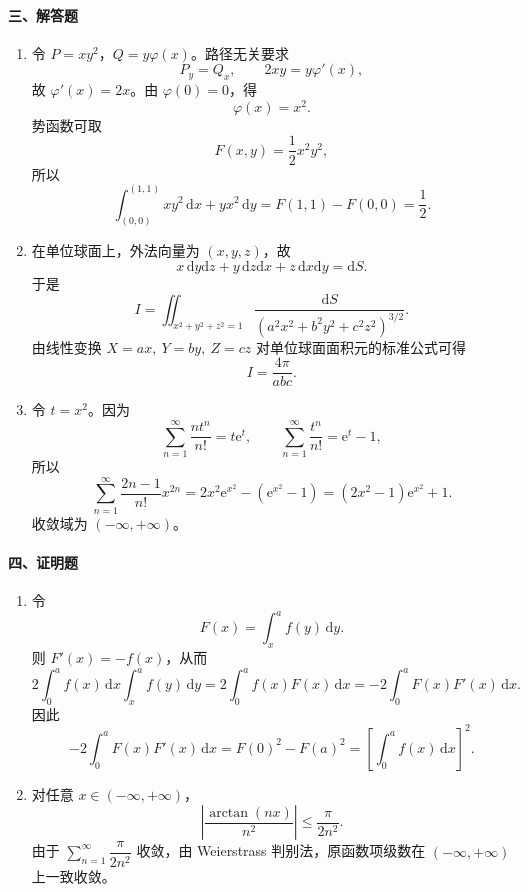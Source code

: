 \paragraph*{三、解答题}
\begin{enumerate}
  \item 令 \(P=xy^2\)，\(Q=y\varphi(x)\)。路径无关要求
  \[
    P_y=Q_x,\qquad 2xy=y\varphi'(x),
  \]
  故 \(\varphi'(x)=2x\)。由 \(\varphi(0)=0\)，得
  \[
    \varphi(x)=x^2.
  \]
  势函数可取
  \[
    F(x,y)=\frac12x^2y^2,
  \]
  所以
  \[
    \int_{(0,0)}^{(1,1)}xy^2\,\mathrm{d}x+yx^2\,\mathrm{d}y
    =F(1,1)-F(0,0)=\frac12.
  \]

  \item 在单位球面上，外法向量为 \((x,y,z)\)，故
  \[
    x\,\mathrm{d}y\mathrm{d}z+y\,\mathrm{d}z\mathrm{d}x+z\,\mathrm{d}x\mathrm{d}y=\mathrm{d}S.
  \]
  于是
  \[
    I=\iint_{x^2+y^2+z^2=1}
    \frac{\mathrm{d}S}{(a^2x^2+b^2y^2+c^2z^2)^{3/2}}.
  \]
  由线性变换 \(X=ax,\ Y=by,\ Z=cz\) 对单位球面面积元的标准公式可得
  \[
    I=\frac{4\pi}{abc}.
  \]

  \item 令 \(t=x^2\)。因为
  \[
    \sum_{n=1}^{\infty}\frac{nt^n}{n!}=t\mathrm{e}^t,\qquad
    \sum_{n=1}^{\infty}\frac{t^n}{n!}=\mathrm{e}^t-1,
  \]
  所以
  \[
    \sum_{n=1}^{\infty}\frac{2n-1}{n!}x^{2n}
    =2x^2\mathrm{e}^{x^2}-(\mathrm{e}^{x^2}-1)
    =(2x^2-1)\mathrm{e}^{x^2}+1.
  \]
  收敛域为 \((-\infty,+\infty)\)。
\end{enumerate}

\paragraph*{四、证明题}
\begin{enumerate}
  \item 令
  \[
    F(x)=\int_x^a f(y)\,\mathrm{d}y.
  \]
  则 \(F'(x)=-f(x)\)，从而
  \[
    2\int_0^a f(x)\,\mathrm{d}x\int_x^a f(y)\,\mathrm{d}y
    =2\int_0^a f(x)F(x)\,\mathrm{d}x
    =-2\int_0^aF(x)F'(x)\,\mathrm{d}x.
  \]
  因此
  \[
    -2\int_0^aF(x)F'(x)\,\mathrm{d}x
    =F(0)^2-F(a)^2
    =\left[\int_0^a f(x)\,\mathrm{d}x\right]^2.
  \]

  \item 对任意 \(x\in(-\infty,+\infty)\)，
  \[
    \left|\frac{\arctan(nx)}{n^2}\right|\le \frac{\pi}{2n^2}.
  \]
  由于 \(\sum_{n=1}^{\infty}\dfrac{\pi}{2n^2}\) 收敛，由 Weierstrass 判别法，原函数项级数在 \((-\infty,+\infty)\) 上一致收敛。
\end{enumerate}

